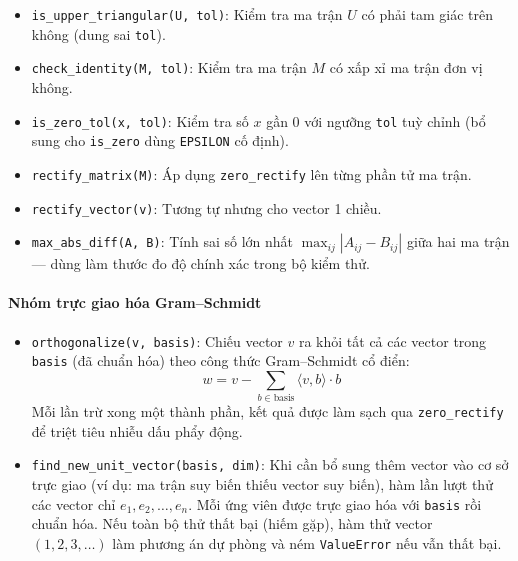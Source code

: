 \begin{itemize}
    \item \texttt{is\_upper\_triangular(U, tol)}: Kiểm tra ma trận $U$ có phải tam giác trên không (dung sai \texttt{tol}).
    \item \texttt{check\_identity(M, tol)}: Kiểm tra ma trận $M$ có xấp xỉ ma trận đơn vị không.
    \item \texttt{is\_zero\_tol(x, tol)}: Kiểm tra số $x$ gần 0 với ngưỡng \texttt{tol} tuỳ chỉnh (bổ sung cho \texttt{is\_zero} dùng \texttt{EPSILON} cố định).
    \item \texttt{rectify\_matrix(M)}: Áp dụng \texttt{zero\_rectify} lên từng phần tử ma trận.
    \item \texttt{rectify\_vector(v)}: Tương tự nhưng cho vector 1 chiều.
    \item \texttt{max\_abs\_diff(A, B)}: Tính sai số lớn nhất $\max_{ij}|A_{ij} - B_{ij}|$ giữa hai ma trận --- dùng làm thước đo độ chính xác trong bộ kiểm thử.
\end{itemize}

\paragraph{Nhóm trực giao hóa Gram--Schmidt}

\begin{itemize}
    \item \texttt{orthogonalize(v, basis)}: Chiếu vector $v$ ra khỏi tất cả các vector trong \texttt{basis} (đã chuẩn hóa) theo công thức Gram--Schmidt cổ điển:
    \begin{equation}
        w = v - \sum_{b \in \text{basis}} \langle v, b \rangle \cdot b
    \end{equation}
    Mỗi lần trừ xong một thành phần, kết quả được làm sạch qua \texttt{zero\_rectify} để triệt tiêu nhiễu dấu phẩy động.
    \item \texttt{find\_new\_unit\_vector(basis, dim)}: Khi cần bổ sung thêm vector vào cơ sở trực giao (ví dụ: ma trận suy biến thiếu vector suy biến), hàm lần lượt thử các vector chỉ $e_1, e_2, \ldots, e_n$. Mỗi ứng viên được trực giao hóa với \texttt{basis} rồi chuẩn hóa. Nếu toàn bộ thử thất bại (hiếm gặp), hàm thử vector $(1,2,3,\ldots)$ làm phương án dự phòng và ném \texttt{ValueError} nếu vẫn thất bại.
\end{itemize}

